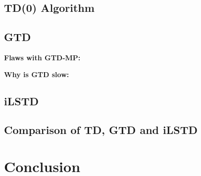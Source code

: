 \documentclass{article}
\begin{document}
\subsection{TD(0) Algorithm}


\subsection{GTD}
\textbf{Flaws with GTD-MP:}

\textbf{Why is GTD slow:}


\subsection{iLSTD}

\subsection{Comparison of TD, GTD and iLSTD}

\section{Conclusion}


\appendix


\end{document}
